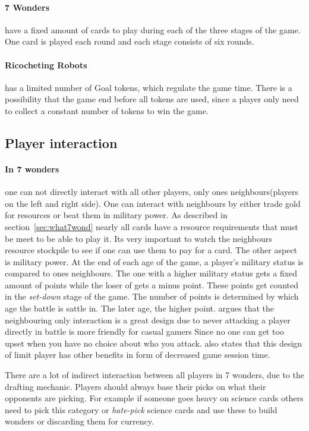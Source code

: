 \documentclass[a4paper]{article}
\begin{document}
\paragraph{7 Wonders} have a fixed amount of cards to play during each of the three stages of the game. One card is played each round and each stage consists of six rounds.

\paragraph{Ricocheting Robots} has a limited number of Goal tokens, which regulate the game time. There is a possibility that the game end before all tokens are used, since a player only need to collect a constant number of tokens to win the game.

\subsection{Player interaction}

\paragraph{In 7 wonders} one can not directly interact with all other players, only ones neighbours(players on the left and right side). One can interact with neighbours by either trade gold for resources or beat them in military power. As described in section~\ref{sec:what7wond} nearly all cards have a resource requirements that must be meet to be able to play it. Its very important to watch the neighbours resource stockpile to see if one can use them to pay for a card. The other aspect is military power. At the end of each age of the game, a player's military status is compared to ones neighbours. The one with a higher military status gets a fixed amount of points while the loser of gets a minus point. These points get counted in the \textit{set-down} stage of the game. The number of points is determined by which age the battle is sattle in. The later age, the higher point. 
 argues that the neighbouring only interaction is a great design due to never attacking a player directly in battle is more friendly for casual gamers Since no one can get too upset when you have no choice about who you attack. \citeauthor{notsacgame7wond} also states that this design of limit player has other benefits in form of decreased game session time. 

There are a lot of indirect interaction between all players in 7 wonders, due to the drafting mechanic. Players should always base their picks on what their opponents are picking. For example if someone goes heavy on science cards others need to pick this category or \textit{hate-pick} science cards and use these to build wonders or discarding them for currency.
\end{document}
